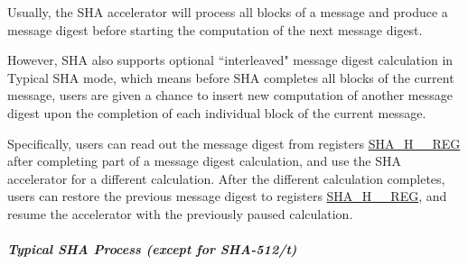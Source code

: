 \documentclass[main\_\_EN.tex]{subfiles}
\begin{document}
Usually, the SHA accelerator will process all blocks of a message and produce a message digest before starting the computation of the next message digest.

However, \chipname{} SHA also supports optional ``interleaved" message digest calculation in Typical SHA mode, which means before SHA completes all blocks of the current message, users are given a chance to insert new computation of another message digest upon the completion of each individual block of the current message.

Specifically, users can read out the message digest from registers \hyperref[regdesc:SHAHNREG]{SHA\_H\_\_REG} after completing part of a message digest calculation, and use the SHA accelerator for a different calculation. After the different calculation completes, users can restore the previous message digest to registers \hyperref[regdesc:SHAHNREG]{SHA\_H\_\_REG}, and resume the accelerator with the previously paused calculation.

\subparagraph{Typical SHA Process (except for SHA-512/{\it{t}})}
\end{document}
